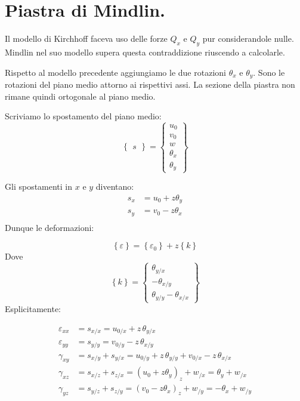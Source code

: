 \section{Piastra di Mindlin.}

Il modello di Kirchhoff faceva uso delle forze $Q_x$ e $Q_y$ pur considerandole nulle. Mindlin nel suo modello supera questa contraddizione riuscendo a calcolarle.

Rispetto al modello precedente aggiungiamo le due rotazioni $\theta_x$ e $\theta_y$. Sono le rotazioni del piano medio attorno ai rispettivi assi. La sezione della piastra non rimane quindi ortogonale al piano medio.

Scriviamo lo spostamento del piano medio:
\begin{equation*}
\left\{
\begin{array}{c}s \end{array}
\right\} =
\left\{
\begin{array}{c}
u_0\\v_0\\w\\\theta_x\\\theta_y
\end{array}
\right\} 
\end{equation*}

Gli spostamenti in $x$ e $y$ diventano:
    \begin{align*}
        s_x&=u_0+z\theta_y\\
        s_y&=v_0-z\theta_x\\
    \end{align*}
Dunque le deformazioni:


\begin{equation*}
  \left\{\varepsilon\right\}=  \left\{\varepsilon_0\right\}+ z\left\{ k\right\}
\end{equation*}
Dove
\begin{equation*}
  \left\{ k\right\}=  \left\{
\begin{array}{c} \theta_{y/x}\\- \theta_{x/y}\\ \theta_{y/y}-\theta_{x/x}
\end{array}\right\}
\end{equation*}
Esplicitamente:

\begin{align*}
    \varepsilon_{xx}&=s_{x/x}= u_{0/x}+z\,\theta_{y/x}\\
     \varepsilon_{yy}&=s_{y/y}=  v_{0/y}-z\,\theta_{x/y}\\
      \gamma_{xy}&=s_{x/y}+s_{y/x}=      u_{0/y}+z\,\theta_{y/y}   + v_{0/x}-z\,\theta_{x/x}\\
       \gamma_{xz}&=s_{x/z}+s_{z/x}=     (u_0+z\theta_y)_z   + w_{/x}= \theta_y+ w_{/x}\\
         \gamma_{yz}&=s_{y/z}+s_{z/y}=     (v_0-z\theta_x)_z   + w_{/y}= -\theta_x+ w_{/y}
\end{align*}

